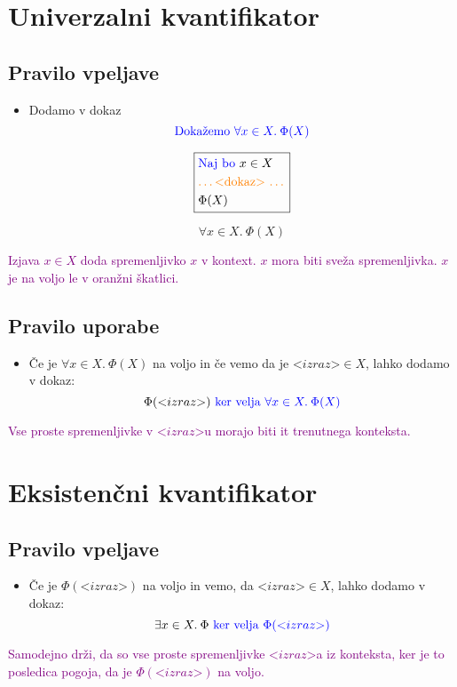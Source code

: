 \documentclass[12pt,a4paper]{article}
\newcommand{\blue}[1]{\textcolor{blue}{#1}}
\newcommand{\orange}[1]{\textcolor{orange}{#1}}
\newcommand{\purple}[1]{\textcolor{purple}{#1}}
\newcommand{\dokaz}{\orange{\text{\ldots <dokaz> \ldots}}}
\newcommand{\izraz}{\text{<} izraz \text{>}}
\newcommand{\skatlica}[1]{
    \begin{equation*}
        \boxed{
        \begin{aligned}
            #1
        \end{aligned}
        }
    \end{equation*}
}
\begin{document}
\section{Univerzalni kvantifikator}
    \subsection*{Pravilo vpeljave}
    \begin{itemize}
        \item Dodamo v dokaz
        $$ \blue{\text{Dokažemo } \forall x \in X. \: \Phi (X)  } $$
        \skatlica{
            &\blue{\text{Naj bo }} x \in X \\ 
            &\dokaz \\ 
            &\Phi (X)
        }
        $$ \forall x \in X. \: \Phi (X) $$
    \end{itemize}
    \purple{Izjava $ x \in X $ doda spremenljivko $x$ v kontext. $x$ mora biti sveža spremenljivka. $x$ je na voljo le v oranžni škatlici. }

    \subsection*{Pravilo uporabe}
    \begin{itemize}
        \item  Če je $ \forall x \in X. \: \Phi (X) $ na voljo in če vemo da je $ \izraz \in X $, lahko dodamo v dokaz:
        $$ \Phi ( \izraz ) \blue{\text{ ker velja } \forall x \in X. \: \Phi (X) } $$ 
    \end{itemize}
    \purple{Vse proste spremenljivke v $ \izraz $u morajo biti it trenutnega konteksta.}

\section{Eksistenčni kvantifikator}
    \subsection*{Pravilo vpeljave}
    \begin{itemize}
        \item Če je $ \Phi ( \izraz )$ na voljo in vemo, da $ \izraz \in X $, lahko dodamo v dokaz:
        $$ \exists x \in X . \: \Phi \blue{\text{ ker velja } \Phi ( \izraz ) } $$ 
    \end{itemize}
    \purple{Samodejno drži, da so vse proste spremenljivke $\izraz$a iz konteksta, ker je to posledica pogoja, da je $\Phi ( \izraz)$ na voljo.}
\end{document}
